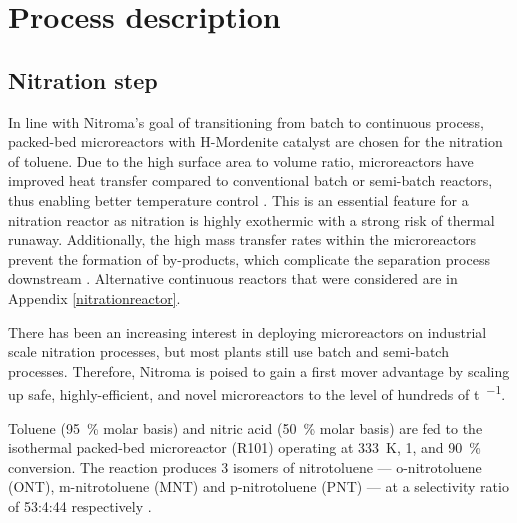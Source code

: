 \section{Process description}
\label{sec:process}
\subsection{Nitration step}
In line with Nitroma's goal of transitioning from batch to continuous process, packed-bed microreactors with H-Mordenite catalyst are chosen for the nitration of toluene. Due to the high surface area to volume ratio, microreactors have improved heat transfer compared to conventional batch or semi-batch reactors, thus enabling better temperature control \cite{halder_nitration_2007}. This is an essential feature for a nitration reactor as nitration is highly exothermic with a strong risk of thermal runaway. Additionally, the high mass transfer rates within the microreactors prevent the formation of by-products, which complicate the separation process downstream \cite{halder_nitration_2007}.
Alternative continuous reactors that were considered are in Appendix \ref{nitrationreactor}. 

There has been an increasing interest in deploying microreactors on industrial scale nitration processes, but most plants still use batch and semi-batch processes. Therefore, Nitroma is poised to gain a first mover advantage by scaling up safe, highly-efficient, and novel microreactors to the level of hundreds of \si{\tonne\per\year}.

Toluene (\SI{95}{\percent} molar basis) and nitric acid (\SI{50}{\percent} molar basis) are fed to the isothermal packed-bed microreactor (R101) operating at \SI{333}{\K}, \SI{1}{\atm}, and \SI{90}{\percent} conversion. The reaction produces 3 isomers of nitrotoluene --- o-nitrotoluene (ONT), m-nitrotoluene (MNT) and p-nitrotoluene (PNT) --- at a selectivity ratio of 53:4:44 respectively \cite{smith_novel_1998}.


